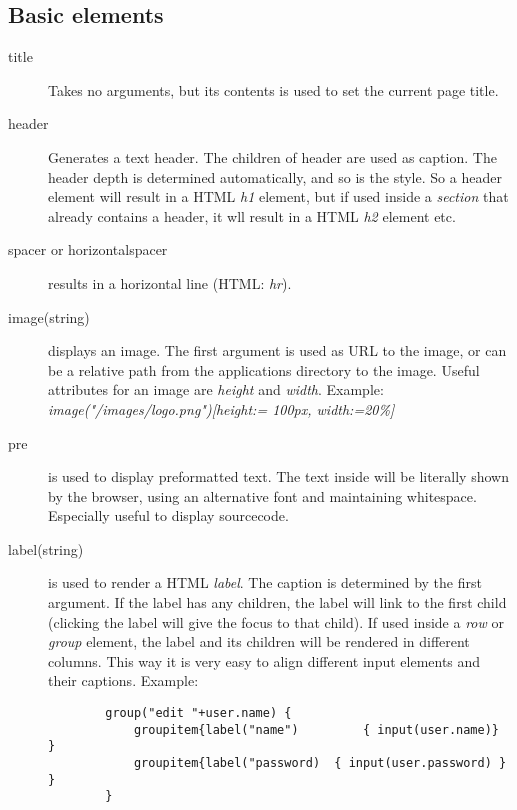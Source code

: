 \subsection{Basic elements}
\begin{description}
	\item[title{}] Takes no arguments, but its contents is used to set the current page title. 
	\item[header{}] Generates a text header. The children of header are used as caption. The header depth is determined automatically, and so is the style. So a header element will result in a HTML \emph{h1} element, but if used inside a \emph{section} that already contains a header, it wll result in a HTML \emph{h2} element etc. 
	\item[spacer or horizontalspacer] results in a horizontal line (HTML: \emph{hr}). 
	\item[image(string)] displays an image. The first argument is used as URL to the image, or can be a relative path from the applications directory to the image. Useful attributes for an image are \emph{height} and \emph{width}. Example: \emph{image("/images/logo.png")[height:= 100px, width:=20\%]}
	\item[pre{}] is used to display preformatted text. The text inside will be literally shown by the browser, using an alternative font and maintaining whitespace. Especially useful to display sourcecode. 
	\item[label(string){}] is used to render a HTML \emph{label}. The caption is determined by the first argument. If the label has any children, the label will link to the first child (clicking the label will give the focus to that child). If used inside a \emph{row} or \emph{group} element, the label and its children will be rendered in different columns. This way it is very easy to align different input elements and their captions. Example:
	\begin{lstlisting}
		group("edit "+user.name) {
			groupitem{label("name") 		{ input(user.name)} }
			groupitem{label("password) 	{ input(user.password) } }
		}
	\end{lstlisting}
\end{description}


